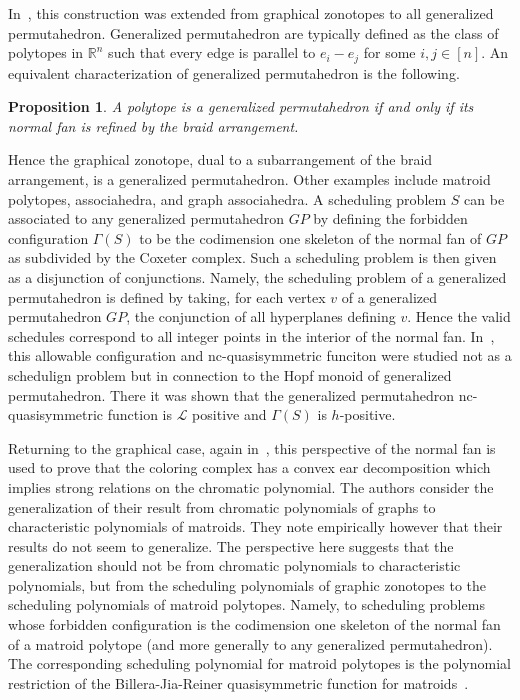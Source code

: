 \documentclass[12pt,reqno]{amsart}
\numberwithin{definition}{section}
\newtheorem{proposition}[definition]{Proposition}
\theoremstyle{definition}
\newcommand{\ncL}{\mathcal{L}}
\newcommand{\forb}{\Gamma} %
\begin{document}
In~\cite{ABK}, this construction was extended from graphical zonotopes to all generalized
permutahedron.   Generalized permutahedron are typically
defined as the class of polytopes in $\mathbb{R}^n$ such that every
edge is parallel to $e_i - e_j$ for some $i,j \in [n]$.  An equivalent
characterization of generalized permutahedron is the following.
\begin{proposition}\cite{PRW,MPSSW}
 A
polytope is a generalized permutahedron if and only if its normal fan
is refined by the braid arrangement.
\end{proposition}
  Hence the
graphical zonotope, dual to a subarrangement of the braid arrangement,
is a generalized permutahedron.  Other examples include matroid
polytopes, associahedra, and graph associahedra.  A scheduling problem
$S$ can be associated to any generalized permutahedron $GP$ by
defining the forbidden configuration $\forb(S)$ to be the codimension
one skeleton of the normal fan of $GP$ as subdivided by the Coxeter
complex.  Such a scheduling problem is then given as a disjunction of
conjunctions.  Namely, the scheduling problem of a generalized
permutahedron is defined by taking, for each vertex $v$ of a
generalized permutahedron $GP$, the conjunction of all hyperplanes
defining $v$.  Hence the valid  schedules correspond to all
integer points in the interior of the normal fan.  In~\cite{ABK}, this allowable configuration and nc-quasisymmetric funciton were studied not as a schedulign problem but in connection to the Hopf monoid of generalized permutahedron.  There it
was shown that the  generalized permutahedron nc-quasisymmetric function is $\ncL$
positive and $\forb(S)$ is $h$-positive.




Returning to the graphical case, again in~\cite{HS}, this perspective of the normal fan is used to prove that the coloring
complex has a convex ear decomposition which implies strong relations on
the chromatic polynomial. The authors consider the generalization of their result from chromatic polynomials of graphs to characteristic polynomials of matroids.
 They note empirically
however that their results do not seem to generalize.  The perspective
here suggests that the generalization should not be from chromatic
polynomials to characteristic polynomials, but from the scheduling
polynomials of graphic zonotopes to the scheduling polynomials of
matroid polytopes.  Namely, to scheduling problems whose forbidden
configuration is the codimension one skeleton of the normal fan of a
matroid polytope  (and more generally to any generalized permutahedron).  The corresponding scheduling polynomial for matroid polytopes is the
polynomial restriction of the Billera-Jia-Reiner quasisymmetric
function for matroids~\cite{BJR}.
\end{document}
